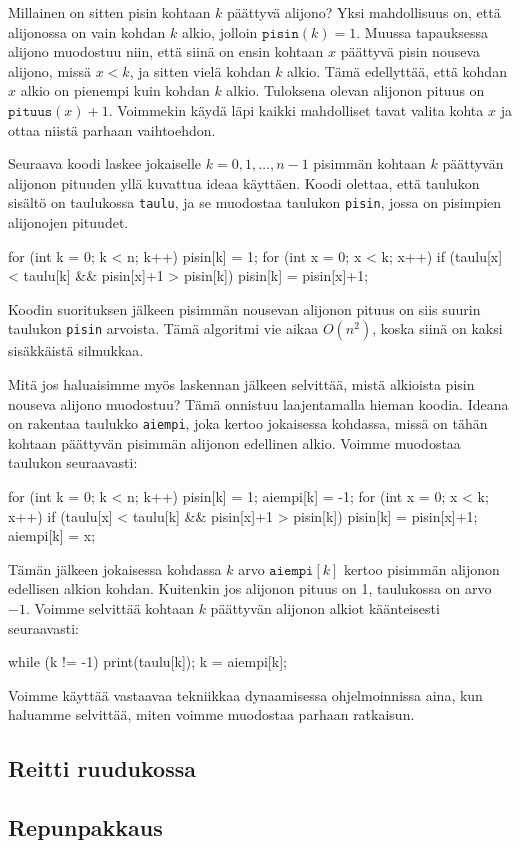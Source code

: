 Millainen on sitten pisin kohtaan $k$ päättyvä alijono?
Yksi mahdollisuus on, että alijonossa on vain kohdan $k$ alkio,
jolloin $\texttt{pisin}(k)=1$.
Muussa tapauksessa alijono muodostuu niin,
että siinä on ensin kohtaan $x$ päättyvä
pisin nouseva alijono, missä $x<k$, ja sitten vielä kohdan $k$ alkio.
Tämä edellyttää, että kohdan $x$ alkio on pienempi
kuin kohdan $k$ alkio.
Tuloksena olevan alijonon pituus on $\texttt{pituus}(x)+1$.
Voimmekin käydä läpi kaikki mahdolliset tavat valita kohta $x$
ja ottaa niistä parhaan vaihtoehdon.

Seuraava koodi laskee jokaiselle $k=0,1,\dots,n-1$
pisimmän kohtaan $k$ päättyvän alijonon pituuden yllä kuvattua
ideaa käyttäen.
Koodi olettaa, että taulukon sisältö on taulukossa \texttt{taulu},
ja se muodostaa taulukon \texttt{pisin}, jossa on pisimpien
alijonojen pituudet.

\begin{code}
for (int k = 0; k < n; k++) {
    pisin[k] = 1;
    for (int x = 0; x < k; x++) {
        if (taulu[x] < taulu[k] && pisin[x]+1 > pisin[k]) {
            pisin[k] = pisin[x]+1;
        }
    }
}
\end{code}

Koodin suorituksen jälkeen pisimmän nousevan alijonon pituus on
siis suurin taulukon \texttt{pisin} arvoista.
Tämä algoritmi vie aikaa $O(n^2)$, koska siinä on kaksi
sisäkkäistä silmukkaa.

Mitä jos haluaisimme myös laskennan jälkeen selvittää, mistä alkioista
pisin nouseva alijono muodostuu? Tämä onnistuu laajentamalla hieman koodia.
Ideana on rakentaa taulukko \texttt{aiempi},
joka kertoo jokaisessa kohdassa, missä on tähän kohtaan
päättyvän pisimmän alijonon edellinen alkio.
Voimme muodostaa taulukon seuraavasti:

\begin{code}
for (int k = 0; k < n; k++) {
    pisin[k] = 1;
    aiempi[k] = -1;
    for (int x = 0; x < k; x++) {
        if (taulu[x] < taulu[k] && pisin[x]+1 > pisin[k]) {
            pisin[k] = pisin[x]+1;
            aiempi[k] = x;
        }
    }
}
\end{code}

Tämän jälkeen jokaisessa kohdassa $k$ arvo $\texttt{aiempi}[k]$
kertoo pisimmän alijonon edellisen alkion kohdan.
Kuitenkin jos alijonon pituus on 1, taulukossa on arvo $-1$.
Voimme selvittää kohtaan $k$ päättyvän alijonon alkiot
käänteisesti seuraavasti:

\begin{code}
while (k != -1) {
    print(taulu[k]);
    k = aiempi[k];
}
\end{code}

Voimme käyttää vastaavaa tekniikkaa
dynaamisessa ohjelmoinnissa aina, kun haluamme
selvittää, miten voimme muodostaa parhaan ratkaisun.

\subsection{Reitti ruudukossa}

\subsection{Repunpakkaus}